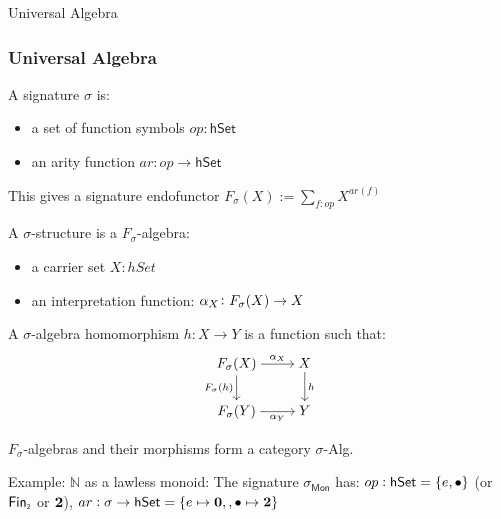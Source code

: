 \documentclass[9pt]{beamer}
\begin{document}
\begin{frame}[fragile]{Universal Algebra}
\frametitle{Universal Algebra}

A \alert{signature} $\sigma$ is:
\begin{itemize}
    \item a set of \alert{function symbols} $op : \mathsf{hSet}$
    \item an \alert{arity function} $ar : op \rightarrow \mathsf{hSet}$
\end{itemize}

This gives a signature endofunctor $F_{\sigma}(X) := \sum_{f : op} X^{ar(f)}$

A $\sigma$-structure is a $F_{\sigma}$-algebra:
\begin{itemize}
    \item a \alert{carrier set} $X : hSet$
    \item an \alert{interpretation function}: $\alpha_X\colon\Sig(X) \to X$
\end{itemize}

A $\sigma$-algebra homomorphism $h: X \rightarrow Y$ is a function such that:
\[\begin{tikzcd}[ampersand replacement=\&,cramped]
	{F_{\sigma}(X)} \& X \\
	{F_{\sigma}(Y)} \& Y
	\arrow["{\alpha_X}", from=1-1, to=1-2]
	\arrow["{F_{\sigma}(h)}"', from=1-1, to=2-1]
	\arrow["{\alpha_Y}"', from=2-1, to=2-2]
	\arrow["h", from=1-2, to=2-2]
\end{tikzcd}\]

$F_{\sigma}$-algebras and their morphisms form a category $\sigma$-Alg.

Example: $\mathbb{N}$ as a \alert{lawless monoid}:
The signature $\sigma_{\mathsf{Mon}}$ has:
$op : \mathsf{hSet} = \{e, \bullet\}$ (or $\Fin[2]$ or ${\mathbf{2}}$),
$ar : \sigma \rightarrow \mathsf{hSet} = \{e \mapsto \mathbf{0},, \bullet \mapsto {\mathbf{2}}\}$

\end{frame}
\end{document}
